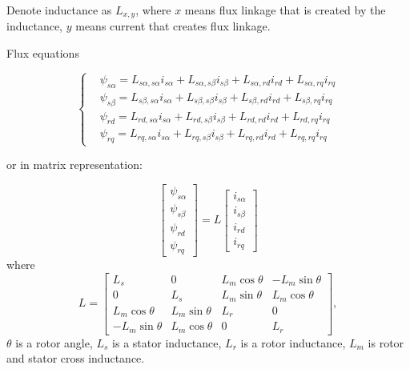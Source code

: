 \documentclass[11pt,a4paper,oneside]{report}
\begin{document}
Denote inductance as $L_{x,y}$, where $x$ means flux linkage that is created by the inductance, $y$ means current that creates flux linkage.

Flux equations

\begin{equation}
	\left\{
	\begin{split}
		& \psi_{s\alpha} = L_{s\alpha, s\alpha}i_{s\alpha}+ L_{s\alpha, s\beta}i_{s\beta}+L_{s\alpha, rd}i_{rd}+L_{s\alpha, rq}i_{rq} \\
		& \psi_{s\beta} = L_{s\beta, s\alpha}i_{s\alpha}+ L_{s\beta, s\beta}i_{s\beta}+L_{s\beta, rd}i_{rd}+L_{s\beta, rq}i_{rq} \\
		& \psi_{rd} = L_{rd, s\alpha}i_{s\alpha}+ L_{rd, s\beta}i_{s\beta}+L_{rd, rd}i_{rd}+L_{rd, rq}i_{rq} \\
		& \psi_{rq} = L_{rq, s\alpha}i_{s\alpha}+ L_{rq, s\beta}i_{s\beta}+L_{rq, rd}i_{rd}+L_{rq, rq}i_{rq} 
	\end{split}
	\right.
\end{equation}

or in matrix representation:

\begin{equation}
	\left[ 
	\begin{split}
		\psi_{s\alpha} \\ \psi_{s\beta} \\ \psi_{rd} \\ \psi_{rq}
	\end{split}
	\right]=L\left[
	\begin{split}
		i_{s\alpha} \\ i_{s\beta} \\ i_{rd} \\ i_{rq}
	\end{split}
	\right]
\end{equation}
where
\begin{equation}
	L=\left[
	\begin{array}{cccc}
		L_s & 0 & L_m\cos\theta & -L_m\sin\theta \\
		0 & L_s & L_m\sin\theta & L_m\cos\theta \\
		L_m\cos\theta & L_m\sin\theta & L_r & 0 \\
		-L_m\sin\theta & L_m\cos\theta & 0 & L_r
	\end{array}
	\right],
\end{equation}
$\theta$ is a rotor angle, $L_s$ is a stator inductance, $L_r$ is a rotor inductance, $L_m$ is rotor and stator cross inductance.
\end{document}
